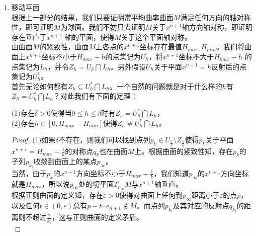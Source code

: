 \begin{enumerate}
\begin{theorem}
\end{theorem}
\begin{proof}
根据之前定理所述，存在定点$O\in\mathbb{R}^{n+1}$，使得任何对称轴都经过定点$O$，我们将曲面适当平移，使得定点$O$平移到坐标原点。假设$A\in M$且到定点$O$的距离为$|A|=r$，则对任何其他到定点$O$ 的距离为$r$ 的点$B$，我们注意到由于$l_{\frac{A-B}{|A-B|}}$经过定点$O$，所以$l_{\frac{A-B}{|A-B|}}$将$A$反射成$B$，故$B\in M$。\\
所以说，$M$是若干同心球面的并集。另外由于$M$是正则连通闭曲面，故它只能是球面。
\end{proof}






\item 移动平面\\
根据上一部分的结果，我们只要证明常平均曲率曲面$M$满足任何方向的轴对称性，即可证明$M$为球面。我们不妨只去证明$M$关于$x^{n+1}$轴方向轴对称，即证明存在垂直于$x^{n+1}$ 轴的平面，使得$M$关于这个平面轴对称。\\
由曲面$M$的紧致性，曲面$M$上各点的$x^{n+1}$坐标存在最值$H_{max},H_{min}$。我们将曲面上$x^{n+1}$坐标不小于$H_{max}-h$的点集记为$U_{h}$，将$x^{n+1}$坐标不大于$H_{max}-h$ 的点集记为$L_{h}$，并令$Z_{h}=U_{h}\bigcap L_{h}$。另外假设$U_{h}$关于平面$x^{n+1}=h$反射后的点集记为$U^{\ast}_{h}$。\\
首先无论如何都有$Z_{h}\subseteq U^{\ast}_{h}\bigcap L_{h}$。一个自然的问题就是对于什么样的$h$有$Z_{h}=U^{\ast}_{h}\bigcap L_{h}$？对此我们有下面的定理：
\begin{theorem}
(1)存在$\delta>0$使得当$0\leq h\leq\delta$时有$Z_{h}=U^{\ast}_{h}\bigcap L_{h}$，\\
(2)存在$h\in[0,H_{max}-H_{min}]$使得$Z_{h}\neq U^{\ast}_{h}\bigcap L_{h}$。
\end{theorem}
\begin{proof}
(1)如果$\delta$不存在，则我们可以找到点列$p_{k}\in U_{\frac{1}{k}}\setminus Z_{\frac{1}{k}}$使得$p_{k}$关于平面$x^{n+1}=H_{max}-\frac{1}{k}$的对称点$q_{k}$也在曲面$M$上。根据曲面的紧致性知，存在$p_{k}$的子列$p_{k_{i}}$收敛到曲面上的某点$p_{\infty}$。\\
当然，由于$p_{k}$的$x^{n+1}$方向坐标不小于$H_{max}-\frac{1}{k}$，我们知道$p_{\infty}$的$x^{n+1}$方向坐标就是$H_{max}$，所以说$p_{\infty}$处的切平面$T_{p_{\infty}}M$与$x^{n+1}$轴垂直。\\
根据正则曲面的定义知，存在$\varepsilon>0$使得对曲面上任何到$p_{\infty}$距离小于$\varepsilon$的点$p$，以及任何$t\in(0,\varepsilon)$总有$p-t\cdot e_{n+1}\notin M$。而点列$p_{k_{i}}$及其对应的反射点$q_{k_{i}}$的距离则不超过$\frac{2}{k_{i}}$，这与正则曲面的定义矛盾。\\

\end{proof}
\end{enumerate}
